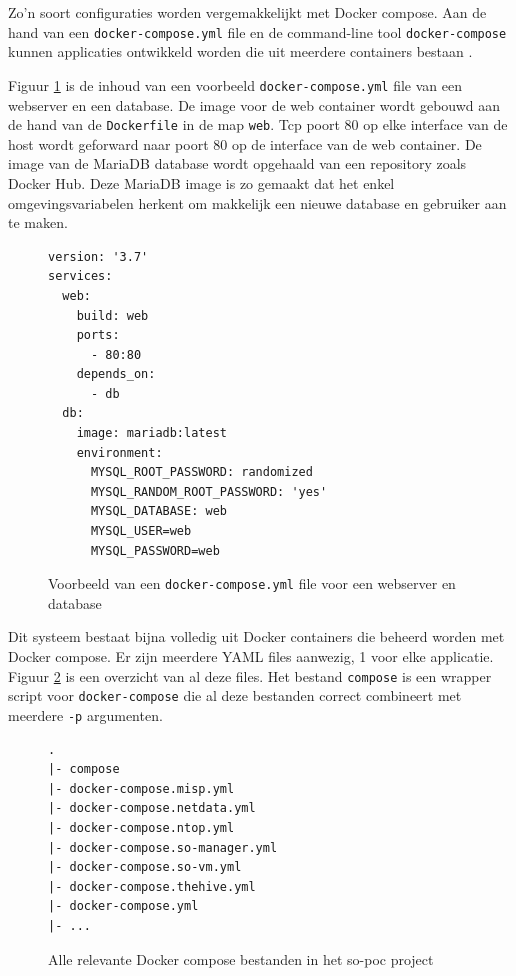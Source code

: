 \documentclass[a4paper,12pt]{report}
\begin{document}
Zo'n soort configuraties worden vergemakkelijkt met Docker compose.
Aan de hand van een \lstinline|docker-compose.yml| file en de command-line tool \lstinline|docker-compose| kunnen applicaties ontwikkeld worden die uit meerdere containers bestaan \autocite{docker:compose}.

Figuur \ref{fig:compose-web-example} is de inhoud van een voorbeeld \lstinline|docker-compose.yml| file van een webserver en een database.
De image voor de web container wordt gebouwd aan de hand van de \lstinline|Dockerfile| in de map \lstinline|web|.
Tcp poort 80 op elke interface van de host wordt geforward naar poort 80 op de interface van de web container.
De image van de MariaDB database wordt opgehaald van een repository zoals Docker Hub.
Deze MariaDB image is zo gemaakt dat het enkel omgevingsvariabelen herkent om makkelijk een nieuwe database en gebruiker aan te maken.

\begin{figure}[H]
  \begin{lstlisting}
version: '3.7'
services:
  web:
    build: web
    ports:
      - 80:80
    depends_on:
      - db
  db:
    image: mariadb:latest
    environment:
      MYSQL_ROOT_PASSWORD: randomized
      MYSQL_RANDOM_ROOT_PASSWORD: 'yes'
      MYSQL_DATABASE: web
      MYSQL_USER=web
      MYSQL_PASSWORD=web
  \end{lstlisting}
  \caption{Voorbeeld van een \lstinline|docker-compose.yml| file voor een webserver en database}
  \label{fig:compose-web-example}
\end{figure}

Dit systeem bestaat bijna volledig uit Docker containers die beheerd worden met Docker compose.
Er zijn meerdere YAML files aanwezig, 1 voor elke applicatie.
Figuur \ref{fig:compose-so-poc-files} is een overzicht van al deze files.
Het bestand \lstinline|compose| is een wrapper script voor \lstinline{docker-compose} die al deze bestanden correct combineert met meerdere \lstinline|-p| argumenten.

\begin{figure}[H]
  \begin{lstlisting}
.
|- compose
|- docker-compose.misp.yml
|- docker-compose.netdata.yml
|- docker-compose.ntop.yml
|- docker-compose.so-manager.yml
|- docker-compose.so-vm.yml
|- docker-compose.thehive.yml
|- docker-compose.yml
|- ...
  \end{lstlisting}
  \caption{Alle relevante Docker compose bestanden in het so-poc project}
  \label{fig:compose-so-poc-files}
\end{figure}
\end{document}
